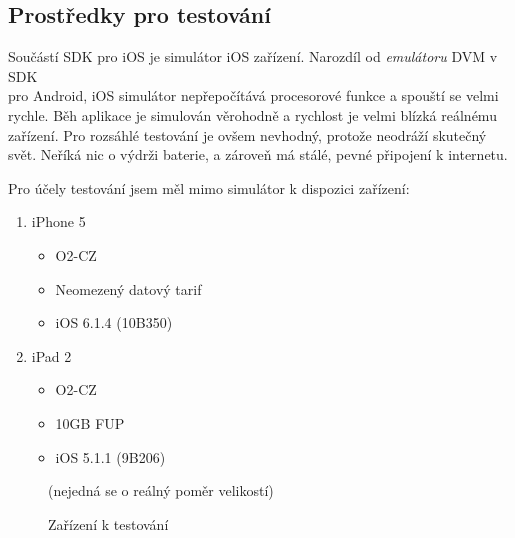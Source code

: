 \subsection{Prostředky pro testování}
Součástí SDK pro iOS je simulátor iOS zařízení. Narozdíl od \emph{emulátoru} DVM v SDK \\pro Android, iOS simulátor nepřepočítává procesorové funkce a spouští se velmi rychle. Běh aplikace je simulován věrohodně a rychlost je velmi blízká reálnému zařízení. Pro rozsáhlé testování je ovšem nevhodný, protože neodráží skutečný svět. Neříká nic o výdrži baterie, a zároveň má stálé, pevné připojení k internetu.

Pro účely testování jsem měl mimo simulátor k dispozici zařízení:

\begin{enumerate}
	\item iPhone 5
	\begin{itemize}
		\item O2-CZ
		\item Neomezený datový tarif
		\item iOS 6.1.4 (10B350)
	\end{itemize}
	
	\item iPad 2
	\begin{itemize}
		\item O2-CZ
		\item 10GB FUP
		\item iOS 5.1.1 (9B206)
	\end{itemize}
\end{enumerate}

\begin{figure}[htp]
	\centering
	\label{figur}

  		\qquad
	\caption{Zařízení k testování} (nejedná se o reálný poměr velikostí)
\end{figure}

